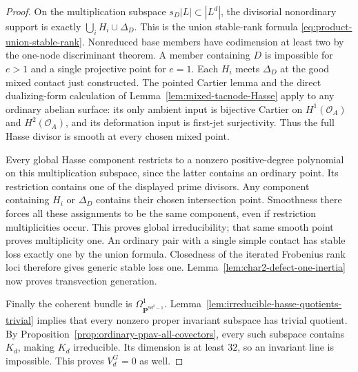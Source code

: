 \begin{proof}
On the multiplication subspace $s_D|L|\subset|L^d|$, the divisorial
nonordinary support is exactly $\bigcup_i H_i\cup\Delta_D$.
This is the union stable-rank formula
\eqref{eq:product-union-stable-rank}. Nonreduced base members have
codimension at least two by the one-node discriminant theorem. A member
containing $D$ is impossible for $e>1$ and a single projective point for
$e=1$. Each $H_i$ meets $\Delta_D$ at the good mixed contact just
constructed. The pointed Cartier lemma and the direct dualizing-form
calculation of Lemma~\ref{lem:mixed-tacnode-Hasse} apply to any ordinary
abelian surface: its only ambient input is bijective Cartier on
$H^1(\mathcal O_A)$ and $H^2(\mathcal O_A)$, and its deformation input is
first-jet surjectivity. Thus the full Hasse divisor is smooth at every
chosen mixed point.

Every global Hasse component restricts to a nonzero positive-degree
polynomial on this multiplication subspace, since the latter contains
an ordinary point. Its restriction contains one of the displayed prime
divisors. Any component containing $H_i$ or $\Delta_D$ contains their
chosen intersection point. Smoothness there forces all these assignments
to be the same component, even if restriction multiplicities occur.
This proves global irreducibility; that same smooth point proves
multiplicity one. An ordinary pair with a single simple contact has
stable loss exactly one by the union formula. Closedness of the iterated
Frobenius rank loci therefore gives generic stable loss one.
Lemma~\ref{lem:char2-defect-one-inertia} now proves transvection generation.

Finally the coherent bundle is $\Omega^1_{\mathbf P^{9d^2-1}}$.
Lemma~\ref{lem:irreducible-hasse-quotients-trivial} implies that every
nonzero proper invariant subspace has trivial quotient. By
Proposition~\ref{prop:ordinary-ppav-all-covectors}, every such subspace
contains $K_d$, making $K_d$ irreducible. Its dimension is at least $32$,
so an invariant line is impossible. This proves $V_d^G=0$ as well.
\end{proof}

